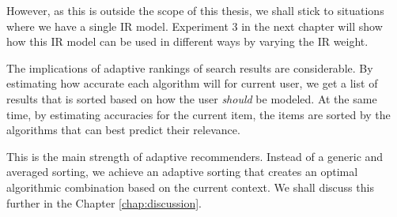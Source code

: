 However, as this is outside the scope of this thesis, 
we shall stick to situations where we have a single IR model.
Experiment 3 in the next chapter will show how this IR model can be used in different ways
by varying the IR weight.

The implications of adaptive rankings of search results are considerable.
By estimating how accurate each algorithm will for current user,
we get a list of results that is sorted based on how the user \emph{should} be modeled.
At the same time, by estimating accuracies for the current item,
the items are sorted by the algorithms that can best predict their relevance.

This is the main strength of adaptive recommenders.
Instead of a generic and averaged sorting, we achieve an adaptive sorting
that creates an optimal algorithmic combination based on the current context.
We shall discuss this further in the Chapter \ref{chap:discussion}.

